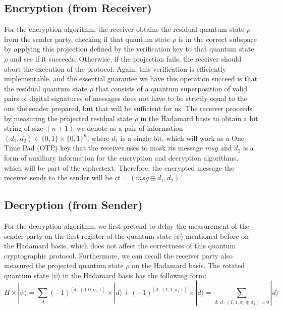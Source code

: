 \documentclass[12pt]{article}
\begin{document}
    
    \subsection{Encryption (from Receiver)}
    \label{subsec:encryption}
    
    For the encryption algorithm, the receiver obtains the residual quantum state $\rho$ from the sender party, checking if that quantum state $\rho$ is in the correct subspace by applying this projection defined by the verification key to that quantum state $\rho$ and see if it succeeds. Otherwise, if the projection fails, the receiver should abort the execution of the protocol. Again, this verification is efficiently implementable, and the essential guarantee we have this operation succeed is that the residual quantum state $\rho$ that consists of a quantum superposition of valid pairs of digital signatures of messages does not have to be strictly equal to the one the sender prepared, but that will be sufficient for us. The receiver proceeds by measuring the projected residual state $\rho$ in the Hadamard basis to obtain a bit string of size $(n + 1)$ we denote as a pair of information $({d}_{1},{d}_{2}) \in \{ 0, 1 \} \times \{{ 0, 1 \}}^{n}$, where ${d}_{1}$ is a single bit, which will work as a One-Time Pad (OTP) key that the receiver uses to mask its message $msg$ and ${d}_{2}$ is a form of auxiliary information for the encryption and decryption algorithms, which will be part of the ciphertext. Therefore, the encrypted message the receiver sends to the sender will be $ct = (msg \oplus {d}_{1}, {d}_{2})$.

    
    \subsection{Decryption (from Sender)}
    \label{subsec:decryption}

    For the decryption algorithm, we first pretend to delay the measurement of the sender party on the first register of the quantum state $|\psi\rangle$ mentioned before on the Hadamard basis, which does not affect the correctness of this quantum cryptographic protocol. Furthermore, we can recall the receiver party also measured the projected quantum state $\rho$ on the Hadamard basis. The rotated quantum state $|\psi\rangle$ in the Hadamard basis has the following form:
    $$ H \times |\psi\rangle = \sum_{d} {(-1)}^{ \left[ d \cdot ( 0, 0, {\sigma}_{0} ) \right] } \times |d\rangle + {(-1)}^{ \left[ d \cdot ( 1, 1, {\sigma}_{1} ) \right] } \times |d\rangle = \sum_{d:\ d \cdot ( 1, 1, {\sigma}_{0} \oplus {\sigma}_{1} ) = 0} |d\rangle $$
\end{document}
